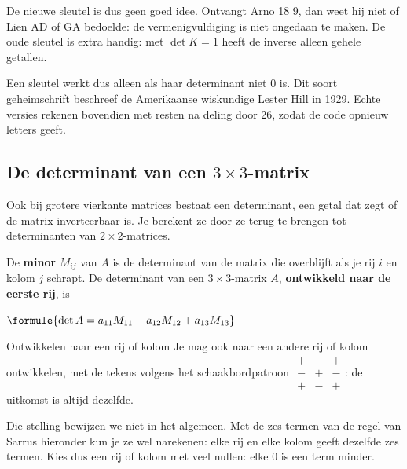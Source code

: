 {\begin{stappenbreed}
\end{stappenbreed}
De nieuwe sleutel is dus geen goed idee. Ontvangt Arno 18 9, dan weet hij niet of Lien AD of GA bedoelde: de vermenigvuldiging is niet ongedaan te maken. De oude sleutel is extra handig: met $\det K = 1$ heeft de inverse alleen gehele getallen.}

Een sleutel werkt dus alleen als haar determinant niet 0 is. Dit soort geheimschrift beschreef de Amerikaanse wiskundige Lester Hill in 1929. Echte versies rekenen bovendien met resten na deling door 26, zodat de code opnieuw letters geeft.

\subsection{De determinant van een \texorpdfstring{$3 \times 3$}{3x3}-matrix}

Ook bij grotere vierkante matrices bestaat een determinant, een getal dat zegt of de matrix inverteerbaar is. Je berekent ze door ze terug te brengen tot determinanten van $2 \times 2$-matrices.

\begin{theorie}
De \textbf{\textcolor{accent}{minor}} $M_{ij}$ van $A$ is de determinant van de matrix die overblijft als je rij $i$ en kolom $j$ schrapt. De determinant van een $3 \times 3$-matrix $A$, \textbf{\textcolor{accent}{ontwikkeld naar de eerste rij}}, is

\vspace{1mm}
\qquad $\formule{\det A = a_{11}M_{11} - a_{12}M_{12} + a_{13}M_{13}}$

\begin{stelling}{Ontwikkelen naar een rij of kolom}
Je mag ook naar een andere rij of kolom ontwikkelen, met de tekens volgens het schaakbordpatroon $\begin{smallmatrix} + & - & + \\ - & + & - \\ + & - & + \end{smallmatrix}$: de uitkomst is altijd dezelfde.
\end{stelling}
\end{theorie}

Die stelling bewijzen we niet in het algemeen. Met de zes termen van de regel van Sarrus hieronder kun je ze wel narekenen: elke rij en elke kolom geeft dezelfde zes termen. Kies dus een rij of kolom met veel nullen: elke 0 is een term minder.


